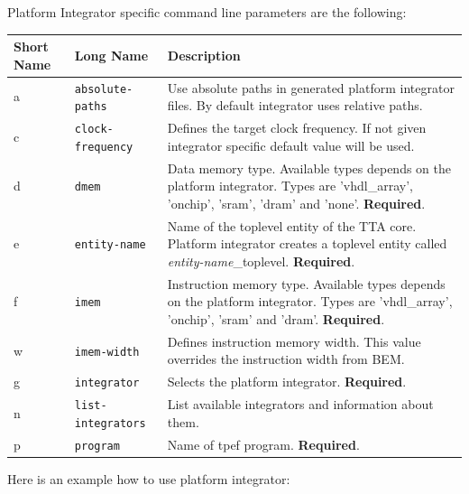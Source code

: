 \documentclass[twoside]{tceusermanual}
\begin{document}
Platform Integrator specific command line parameters are the following:

\begin{center}
\begin{longtable}[htb]{@{}p{}@{}p{}%
                     @{}p{}}

\textbf{Short Name} &\textbf{Long Name} &\textbf{Description} \\
\hline

a & \verb|absolute-paths| &
Use absolute paths in generated platform integrator files. By default
integrator uses relative paths.\\

c & \verb|clock-frequency| &
Defines the target clock frequency. If not given integrator specific default
value will be used. \\

d & \verb|dmem| &
Data memory type. Available types depends on the platform integrator. Types are
'vhdl\_array', 'onchip', 'sram', 'dram' and 'none'. \textbf{Required}. \\

e & \verb|entity-name| &
Name of the toplevel entity of the TTA core. Platform integrator creates a
toplevel entity called \textit{entity-name}\_toplevel.
\textbf{Required}. \\

f & \verb|imem| &
Instruction memory type. Available types depends on the platform integrator.
Types are 'vhdl\_array', 'onchip', 'sram' and 'dram'. \textbf{Required}. \\

w & \verb|imem-width| &
Defines instruction memory width. This value overrides the instruction width
from BEM. \\

g & \verb|integrator| &
Selects the platform integrator. \textbf{Required}. \\

n & \verb|list-integrators| &
List available integrators and information about them. \\

p & \verb|program| &
Name of tpef program. \textbf{Required}.

\end{longtable}
\end{center}

Here is an example how to use platform integrator:

\end{document}
